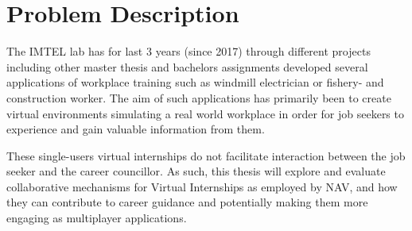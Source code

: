 \section{Problem Description}
The IMTEL lab has for last 3 years (since 2017) through different projects including other master thesis and bachelors assignments developed several applications of workplace training such as windmill electrician \cite{henrichsen2019engaging} or fishery- and construction worker. The aim of such applications has primarily been to create virtual environments simulating a real world workplace in order for job seekers to experience and gain valuable information from them.

These single-users virtual internships do not facilitate interaction between the job seeker and the career councillor. 
As such, this thesis will explore and evaluate collaborative mechanisms for Virtual Internships as employed by NAV, and how they can contribute to career guidance and potentially making them more engaging as multiplayer applications.


\clearpage

